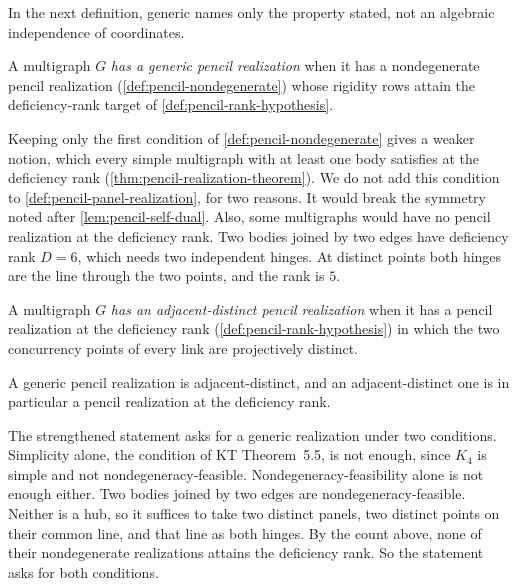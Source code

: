 In the next definition, generic names only the property stated, not an
algebraic independence of coordinates.

\begin{definition}
  \label{def:pencil-generic-motive}
  \leanok
  A multigraph $G$ \emph{has a generic pencil realization} when it has a
  nondegenerate pencil realization (\cref{def:pencil-nondegenerate})
  whose rigidity rows attain the deficiency-rank target of
  \cref{def:pencil-rank-hypothesis}.
\end{definition}

Keeping only the first condition of \cref{def:pencil-nondegenerate} gives
a weaker notion, which every simple multigraph with at least one body
satisfies at the deficiency rank (\cref{thm:pencil-realization-theorem}). We do not
add this condition to \cref{def:pencil-panel-realization}, for two reasons.
It would break the symmetry noted after \cref{lem:pencil-self-dual}. Also,
some multigraphs would have no pencil realization at the deficiency rank.
Two bodies joined by two edges have deficiency rank $D = 6$, which needs
two independent hinges. At distinct points both hinges are the line
through the two points, and the rank is $5$.

\begin{definition}
  \label{def:pencil-distinct-motive}
  \leanok
  A multigraph $G$ \emph{has an adjacent-distinct pencil realization}
  when it has a pencil realization at the deficiency rank
  (\cref{def:pencil-rank-hypothesis}) in which the two concurrency points
  of every link are projectively distinct.
\end{definition}

A generic pencil realization is adjacent-distinct, and an
adjacent-distinct one is in particular a pencil realization at the
deficiency rank.

The strengthened statement asks for a generic realization under two
conditions. Simplicity alone, the condition of KT Theorem~5.5, is not
enough, since $K_4$ is simple and not nondegeneracy-feasible.
Nondegeneracy-feasibility alone is not enough either. Two bodies joined
by two edges are nondegeneracy-feasible. Neither is a hub, so it suffices
to take two distinct panels, two distinct points on their common line, and
that line as both hinges. By the count above, none of their nondegenerate
realizations attains the deficiency rank. So the statement asks for both
conditions.

